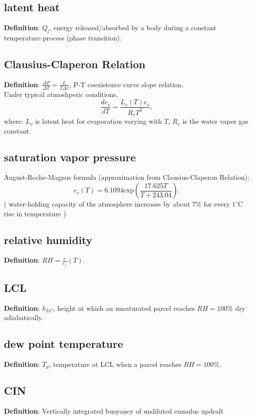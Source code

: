 \subsection{latent heat}
{\bf Definition}: $Q_l$, energy released/absorbed by a body during a constant temperature process (phase transition).


\subsection{Clausius-Claperon Relation}
{\bf Definition}: $\frac{\Delta P}{\Delta T} = \frac{L}{T\Delta v}$, P-T coexistence curve slope relation. \\
Under typical atmoshperic conditions, 
\begin{equation}
   \frac{d e_s}{dT} = \frac{L_v(T)e_s}{R_vT^2}, 
\end{equation}
where: $L_v$ is latent heat for evaporation varying with $T$, 
$R_v$ is the water vapor gas constant. \\

\subsection{saturation vapor pressure}
\noindent August-Roche-Magnus formula (approximation from Clausius-Claperon Relation): \\
\begin{equation}
   e_s(T) = 6.1094 \text{exp}(\frac{17.625T}{T+243.04}).
\end{equation}
( water-holding capacity of the atmosphere increases by about $7\%$ for every $1^{\circ}$C rise in temperature )

\subsection{relative humidity}
{\bf Definition}: $RH = \frac{e}{e_s}(T)$.

\subsection{LCL}
{\bf Definition}: $h_{LC}$, height at which an unsaturated parcel reaches $RH=100\%$ dry adiabatically.

\subsection{dew point temperature}
{\bf Definition}: $T_d$, temperature at LCL when a parcel reaches $RH=100\%$.

\subsection{CIN}
{\bf Definition}: Vertically integrated buoyancy of undiluted cumulus updraft
